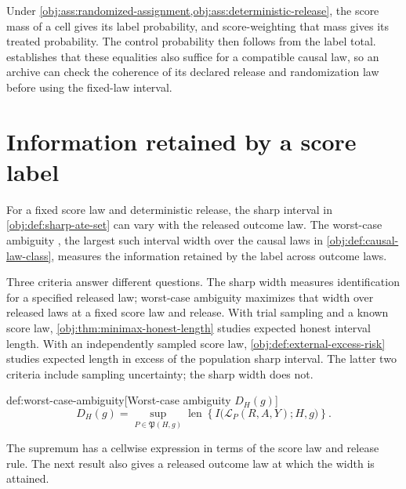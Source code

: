 \documentclass[11pt]{article}
\begin{document}
Under \cref{obj:ass:randomized-assignment,obj:ass:deterministic-release}, the score mass of a cell gives its label probability, and score-weighting that mass gives its treated probability. The control probability then follows from the label total.  establishes that these equalities also suffice for a compatible causal law, so an archive can check the coherence of its declared release and randomization law before using the fixed-law interval.


\section{Information retained by a score label}

For a fixed score law and deterministic release, the sharp interval in \cref{obj:def:sharp-ate-set} can vary with the released outcome law. The worst-case ambiguity , the largest such interval width over the causal laws in \cref{obj:def:causal-law-class}, measures the information retained by the label across outcome laws.

Three criteria answer different questions. The sharp width measures identification for a specified released law; worst-case ambiguity maximizes that width over released laws at a fixed score law and release. With trial sampling and a known score law, \cref{obj:thm:minimax-honest-length} studies expected honest interval length. With an independently sampled score law, \cref{obj:def:external-excess-risk} studies expected length in excess of the population sharp interval. The latter two criteria include sampling uncertainty; the sharp width does not.

\begin{definitionv}{def:worst-case-ambiguity}[Worst-case ambiguity $D_H(g)$]
\[
D_H(g)
=
\sup_{P\in\mathfrak P(H,g)}
\operatorname{len}\!\left\{
I\bigl(\mathcal L_P(R,A,Y);H,g\bigr)
\right\}.
\]
\end{definitionv}

The supremum has a cellwise expression in terms of the score law and release rule. The next result also gives a released outcome law at which the width is attained.
\end{document}
